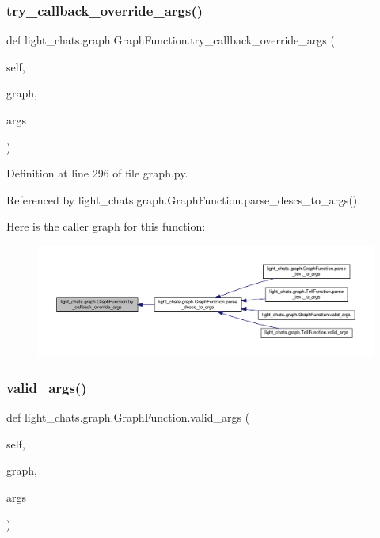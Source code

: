 \subsubsection{\texorpdfstring{try\+\_\+callback\+\_\+override\+\_\+args()}{try\_callback\_override\_args()}}
{\footnotesize\ttfamily def light\+\_\+chats.\+graph.\+Graph\+Function.\+try\+\_\+callback\+\_\+override\+\_\+args (\begin{DoxyParamCaption}\item[{}]{self,  }\item[{}]{graph,  }\item[{}]{args }\end{DoxyParamCaption})}



Definition at line 296 of file graph.\+py.



Referenced by light\+\_\+chats.\+graph.\+Graph\+Function.\+parse\+\_\+descs\+\_\+to\+\_\+args().

Here is the caller graph for this function\+:
\nopagebreak
\begin{figure}[H]
\begin{center}
\leavevmode
\includegraphics[width=350pt]{classlight__chats_1_1graph_1_1GraphFunction_a9769b13542f28f04977e374057bbc017_icgraph}
\end{center}
\end{figure}
\mbox{\label{classlight__chats_1_1graph_1_1GraphFunction_a8ac297dcadb1e5ec360f55f293dcbfcb}} 
\subsubsection{\texorpdfstring{valid\+\_\+args()}{valid\_args()}}
{\footnotesize\ttfamily def light\+\_\+chats.\+graph.\+Graph\+Function.\+valid\+\_\+args (\begin{DoxyParamCaption}\item[{}]{self,  }\item[{}]{graph,  }\item[{}]{args }\end{DoxyParamCaption})}



